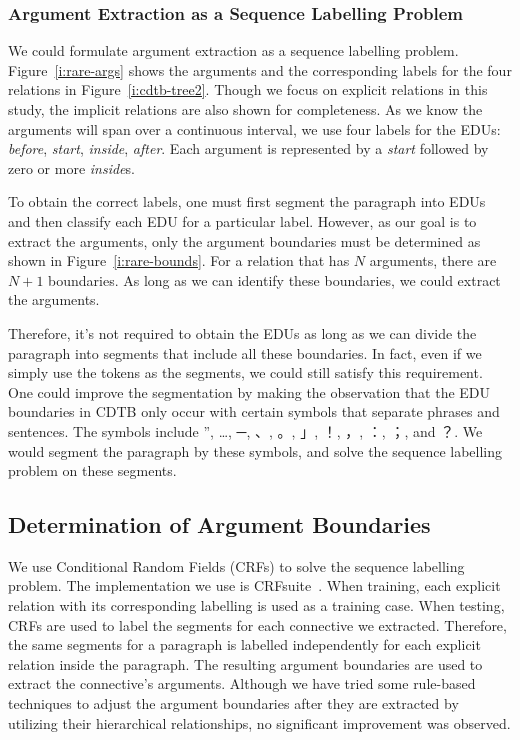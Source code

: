 \subsubsection{Argument Extraction as a Sequence Labelling Problem}

We could formulate argument extraction as a sequence labelling problem.
Figure~\ref{i:rare-args} shows the arguments and the corresponding labels
for the four relations in Figure~\ref{i:cdtb-tree2}. Though we
focus on explicit relations in this study, the implicit relations are also shown
for completeness.
As we know the arguments will span over a continuous interval,
we use four labels for the EDUs: \textit{before}, \textit{start},
\textit{inside}, \textit{after}. Each argument is represented by
a \textit{start} followed by zero or more \textit{inside}s.



To obtain the correct labels, one must first segment the paragraph
into EDUs and then classify each EDU for a particular label.
However, as our goal is to extract the arguments, only the
argument boundaries must be determined as shown in
Figure~\ref{i:rare-bounds}. For a relation that has $N$ arguments,
there are $N+1$ boundaries. As long as we can identify these boundaries,
we could extract the arguments.




Therefore, it's not required to obtain the EDUs as long as
we can divide the paragraph into segments that include all these boundaries.
In fact, even if we simply use the tokens as the segments, we could still satisfy
this requirement. One could improve the segmentation by making the observation
that the EDU boundaries in CDTB only occur with certain symbols that separate
phrases and sentences. The symbols include ”, …, ─, 、, 。, 」, ！, ，, ：, ；, and ？.
We would segment the paragraph by these symbols, and solve the sequence labelling
problem on these segments.

\subsection{Determination of Argument Boundaries}

We use Conditional Random Fields (CRFs) to solve the sequence labelling problem.
The implementation we use is CRFsuite~\citep{CRFsuite}. When training, each explicit
relation with its corresponding labelling is used as a training case. When testing,
CRFs are used to label the segments for each connective we extracted. Therefore,
the same segments for a paragraph is labelled independently for each explicit relation
inside the paragraph. The resulting argument boundaries are used to extract the connective's
arguments. Although we have tried some rule-based techniques to adjust the argument boundaries
after they are extracted by utilizing their hierarchical relationships,
no significant improvement was observed.

